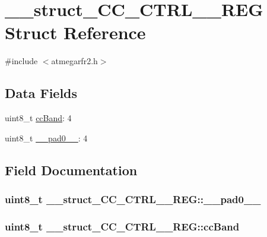 \hypertarget{struct____struct___c_c___c_t_r_l__1___r_e_g}{\section{\-\_\-\-\_\-struct\-\_\-\-C\-C\-\_\-\-C\-T\-R\-L\-\_\-\_\-\-R\-E\-G Struct Reference}
\label{struct____struct___c_c___c_t_r_l__1___r_e_g}
}


{\ttfamily \#include $<$atmegarfr2.\-h$>$}

\subsection*{Data Fields}
\begin{DoxyCompactItemize}
\item 
uint8\-\_\-t \hyperlink{struct____struct___c_c___c_t_r_l__1___r_e_g_ade6ca770373eb320c3c7da42dc761fbe}{cc\-Band}\-: 4
\item 
uint8\-\_\-t \hyperlink{struct____struct___c_c___c_t_r_l__1___r_e_g_ad3d4b36271f3bd908cea3c24cf669611}{\-\_\-\-\_\-pad0\-\_\-\-\_\-}\-: 4
\end{DoxyCompactItemize}


\subsection{Field Documentation}
\hypertarget{struct____struct___c_c___c_t_r_l__1___r_e_g_ad3d4b36271f3bd908cea3c24cf669611}{
\subsubsection[{\-\_\-\-\_\-pad0\-\_\-\-\_\-}]{\setlength{\rightskip}{0pt plus 5cm}uint8\-\_\-t \-\_\-\-\_\-struct\-\_\-\-C\-C\-\_\-\-C\-T\-R\-L\-\_\-\_\-\-R\-E\-G\-::\-\_\-\-\_\-pad0\-\_\-\-\_\-}}\label{struct____struct___c_c___c_t_r_l__1___r_e_g_ad3d4b36271f3bd908cea3c24cf669611}
\hypertarget{struct____struct___c_c___c_t_r_l__1___r_e_g_ade6ca770373eb320c3c7da42dc761fbe}{
\subsubsection[{cc\-Band}]{\setlength{\rightskip}{0pt plus 5cm}uint8\-\_\-t \-\_\-\-\_\-struct\-\_\-\-C\-C\-\_\-\-C\-T\-R\-L\-\_\-\_\-\-R\-E\-G\-::cc\-Band}}\label{struct____struct___c_c___c_t_r_l__1___r_e_g_ade6ca770373eb320c3c7da42dc761fbe}


